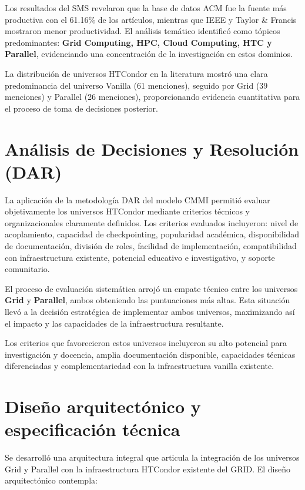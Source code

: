 Los resultados del SMS revelaron que la base de datos ACM fue la fuente más productiva con el 61.16\% de los artículos, mientras que IEEE y Taylor \& Francis mostraron menor productividad. El análisis temático identificó como tópicos predominantes: \textbf{Grid Computing, HPC, Cloud Computing, HTC y Parallel}, evidenciando una concentración de la investigación en estos dominios.

La distribución de universos HTCondor en la literatura mostró una clara predominancia del universo Vanilla (61 menciones), seguido por Grid (39 menciones) y Parallel (26 menciones), proporcionando evidencia cuantitativa para el proceso de toma de decisiones posterior.

\section{Análisis de Decisiones y Resolución (DAR)}
\noindent

La aplicación de la metodología DAR del modelo CMMI permitió evaluar objetivamente los universos HTCondor mediante criterios técnicos y organizacionales claramente definidos. Los criterios evaluados incluyeron: nivel de acoplamiento, capacidad de checkpointing, popularidad académica, disponibilidad de documentación, división de roles, facilidad de implementación, compatibilidad con infraestructura existente, potencial educativo e investigativo, y soporte comunitario.

El proceso de evaluación sistemática arrojó un empate técnico entre los universos \textbf{Grid} y \textbf{Parallel}, ambos obteniendo las puntuaciones más altas. Esta situación llevó a la decisión estratégica de implementar ambos universos, maximizando así el impacto y las capacidades de la infraestructura resultante.

Los criterios que favorecieron estos universos incluyeron su alto potencial para investigación y docencia, amplia documentación disponible, capacidades técnicas diferenciadas y complementariedad con la infraestructura vanilla existente.

\section{Diseño arquitectónico y especificación técnica}
\noindent

Se desarrolló una arquitectura integral que articula la integración de los universos Grid y Parallel con la infraestructura HTCondor existente del GRID. El diseño arquitectónico contempla:


